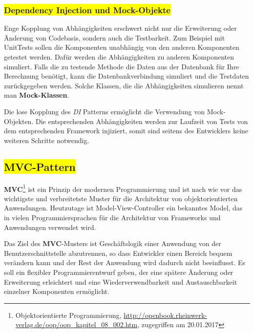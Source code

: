 \subsubsection{\colorbox{yellow}{Dependency Injection und Mock-Objekte}}\label{di}

Enge Kopplung von Abhängigkeiten erschwert nicht nur die Erweiterung oder Änderung von Codebasis, sondern auch die Testbarkeit. Zum Beispiel mit UnitTests sollen die Komponenten unabhängig von den anderen Komponenten getestet werden. Dafür werden die Abhängigkeiten zu anderen Komponenten simuliert. Falls die zu testende Methode die Daten aus der Datenbank für Ihre Berechnung benötigt, kann die Datenbankverbindung simuliert und die Testdaten zurückgegeben werden. Solche Klassen, die die Abhängigkeiten simulieren nennt man \textbf{Mock-Klassen}.

Die lose Kopplung des \textit{DI} Patterns ermöglicht die Verwendung von Mock-Objekten. Die entsprechenden Abhängigkeiten werden zur Laufzeit von Tests von dem entsprechenden Framework injiziert, somit sind seitens des Entwicklers keine weiteren Schritte notwendig.

\subsection{\colorbox{yellow}{MVC-Pattern}}\label{mvc}

\textbf{MVC}\footnote{Objektorientierte Programmierung, \url{http://openbook.rheinwerk-verlag.de/oop/oop_kapitel_08_002.htm}, zugegriffen am 20.01.2017} ist ein Prinzip der modernen Programmierung und ist nach wie vor das wichtigste und verbreitetste Muster für die Architektur von objektorientierten Anwendungen. Heutzutage ist Model-View-Controller ein bekanntes Model, das in vielen Programmiersprachen für die Architektur von Frameworks und Anwendungen verwendet wird.

Das Ziel des \textbf{MVC}-Musters ist Geschäftslogik einer Anwendung von der Benutzerschnittstelle abzutrennen, so dass Entwickler einen Bereich bequem verändern kann und der Rest der Anwendung wird dadurch nicht beeinflusst.
Es soll ein flexibler Programmierentwurf geben, der eine spätere Änderung oder Erweiterung erleichtert und eine Wiederverwendbarkeit und Austauschbarkeit einzelner Komponenten ermöglicht.

